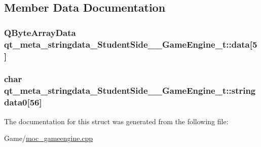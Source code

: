 \subsection{Member Data Documentation}
\hypertarget{structqt__meta__stringdata___student_side_____game_engine__t_aa6366f6e71cef2c92fa62156715535e6}{
\subsubsection[{data}]{\setlength{\rightskip}{0pt plus 5cm}Q\-Byte\-Array\-Data qt\-\_\-meta\-\_\-stringdata\-\_\-\-Student\-Side\-\_\-\-\_\-\-Game\-Engine\-\_\-t\-::data\mbox{[}5\mbox{]}}}\label{structqt__meta__stringdata___student_side_____game_engine__t_aa6366f6e71cef2c92fa62156715535e6}
\hypertarget{structqt__meta__stringdata___student_side_____game_engine__t_ab37bb3a2060f5e5cdfb8c0b067c220db}{
\subsubsection[{stringdata0}]{\setlength{\rightskip}{0pt plus 5cm}char qt\-\_\-meta\-\_\-stringdata\-\_\-\-Student\-Side\-\_\-\-\_\-\-Game\-Engine\-\_\-t\-::stringdata0\mbox{[}56\mbox{]}}}\label{structqt__meta__stringdata___student_side_____game_engine__t_ab37bb3a2060f5e5cdfb8c0b067c220db}


The documentation for this struct was generated from the following file\-:\begin{DoxyCompactItemize}
\item 
Game/\hyperlink{moc__gameengine_8cpp}{moc\-\_\-gameengine.\-cpp}\end{DoxyCompactItemize}
